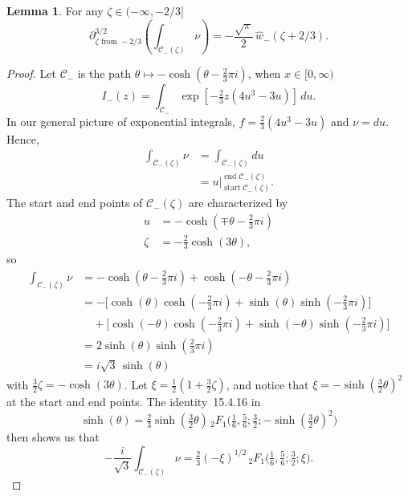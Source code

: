 \documentclass{article}
\theoremstyle{definition}
\newtheorem{lemma}[definition]{Lemma}
\begin{document}
\begin{lemma}\label{claim 3}
For any $\zeta\in (-\infty,-2/3]$
\[ \partial^{3/2}_{\zeta \text{ from } -2/3} \left( \int_{\mathcal{C}_-(\zeta)} \nu \right) = - \frac{\sqrt{\pi}}{2}\,\hat{w}_-(\zeta+2/3). \]
\end{lemma}
\begin{proof}
Let $\mathcal{C}_-$ is the path $\theta \mapsto -\cosh(\theta - \tfrac{2}{3}\pi i)$, when $x \in [0, \infty)$ 
\[ I_-(z) = \int_{\mathcal{C}_-} \exp\left[-\tfrac{2}{3} z \left(4u^3 - 3u\right)\right]\,du. \]
In our general picture of exponential integrals, $f = \tfrac{2}{3}(4u^3 - 3u)$ and $\nu = du$. Hence,
\begin{align*}
\int_{\mathcal{C}_-(\zeta)} \nu & = \int_{\mathcal{C}_-(\zeta)} du \\
& = u \Big|_{\operatorname{start} \mathcal{C}_-(\zeta)}^{\operatorname{end} \mathcal{C}_-(\zeta)}.
\end{align*}
The start and end points of $\mathcal{C}_-(\zeta)$ are characterized by
\begin{align*}
u & = -\cosh(\mp\theta - \tfrac{2}{3}\pi i) \\
\zeta & = -\tfrac{2}{3} \cosh(3\theta),
\end{align*}
so
\begin{align*}
\int_{\mathcal{C}_-(\zeta)} \nu & =- \cosh(\theta - \tfrac{2}{3}\pi i) + \cosh(-\theta - \tfrac{2}{3}\pi i) \\
& =- \big[\cosh(\theta) \cosh(-\tfrac{2}{3}\pi i) + \sinh(\theta) \sinh(-\tfrac{2}{3}\pi i)\big] \\
& \quad + \big[\cosh(-\theta) \cosh(-\tfrac{2}{3}\pi i) + \sinh(-\theta) \sinh(-\tfrac{2}{3}\pi i)\big] \\
& = 2\sinh(\theta) \sinh(\tfrac{2}{3}\pi i) \\
& = i\sqrt{3}\,\sinh(\theta)
\end{align*}
with $\tfrac{3}{2} \zeta = -\cosh(3\theta)$. Let $\xi = \tfrac{1}{2}(1 + \tfrac{3}{2}\zeta)$, and notice that $\xi =- \sinh(\tfrac{3}{2} \theta)^2$ at the start and end points. The identity~15.4.16 in \cite{dlmf}
\[ \sinh(\theta) = \tfrac{2}{3} \sinh(\tfrac{3}{2} \theta)\, {}_2F_1\big(\tfrac{1}{6}, \tfrac{5}{6}; \tfrac{3}{2}; -\sinh(\tfrac{3}{2} \theta)^2\big) \]
then shows us that
\[ -\frac{i}{\sqrt{3}} \int_{\mathcal{C}_-(\zeta)} \nu = \tfrac{2}{3} (-\xi)^{1/2}\, {}_2F_1\big(\tfrac{1}{6}, \tfrac{5}{6}; \tfrac{3}{2}; \xi\big). \]


\end{proof}
\end{document}
